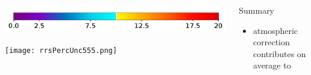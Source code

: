 \documentclass[final]{beamer}
\newlength{\sepwid}
\newlength{\onecolwid}
\newlength{\twocolwid}
\begin{document}
\begin{frame}[t]
\begin{columns}[t]
\begin{column}{\twocolwid}
\begin{framed}
\begin{center}
\includegraphics[trim =0 10 0 50,clip,width=0.5\linewidth,keepaspectratio]{rrsUNCcolorbar.png}


\texttt{[image: rrsPercUnc555.png]}
\end{center}
\end{framed}

\begin{columns}[t,totalwidth=\twocolwid] %
\begin{column}{\onecolwid} %







\end{column} %

\end{columns} %

\end{column} %


\begin{column}{\onecolwid} %

\begin{block}{Summary}
\begin{itemize}
\item atmospheric correction contributes on average to 
\end{itemize}
\end{block}


\end{column}
\end{columns}
\end{frame}
\end{document}
